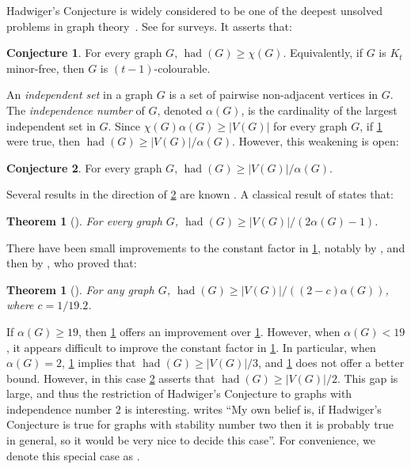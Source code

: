 \documentclass[11pt]{article}
\numberwithin{equation}{section}
\theoremstyle{plain}
\newtheorem{thm}[equation]{Theorem}
\theoremstyle{definition}
\newtheorem{conj}[thm]{Conjecture}
\renewcommand{\geq}{\geqslant}
\DeclareMathOperator{\had}{had}
\newcommand{\defn}[1]{\textcolor{green!50!black}{\textit{#1}}}
\begin{document}
Hadwiger's Conjecture is widely considered to be one of the deepest unsolved problems in graph theory~\citep{Hadwiger43}. See \citep{Kawa15,Toft96,SeymourHC,CV20} for surveys. It asserts that:
\begin{conj}
    \label{conj:hc}
    For every graph $G$, $\had(G) \geq \chi(G)$. Equivalently, if $G$ is $K_t$ minor-free, then $G$ is $(t-1)$-colourable.
\end{conj}
An \defn{independent set} in a graph $G$ is a set of pairwise non-adjacent vertices in $G$. The \defn{independence number} of $G$, denoted \defn{$\alpha(G)$}, is the cardinality of the largest independent set in $G$. Since $\chi(G) \alpha(G) \geq |V(G)|$ for every graph $G$, if \cref{conj:hc} were true, then $\had(G) \geq |V(G)|/\alpha(G)$. However, this weakening is open:
\begin{conj}
    \label{conj:indep}
    For every graph $G$, $\had(G) \geq |V(G)|/\alpha(G)$.
\end{conj}
Several results in the direction of \cref{conj:indep} are known \citep{DM82,Fox10,BK11,bohme2011minors, KawaHadwigerOdd07, FradkinClique12}. A classical result of \citet{DM82} states that:
\begin{thm}[\citet{DM82}]
    \label{thm:dm}
    For every graph $G$, $\had(G) \geq  |V(G)|/ (2\alpha(G) -1)$.
\end{thm}
There have been small improvements to the constant factor in \cref{thm:dm}, notably by \citet{Fox10}, and then by \citet{BK11}, who proved that:
\begin{thm}[\citet{BK11}]
    \label{thm:complete_minors_indep_no}
    For any graph $G$, $\had(G) \geq |V(G)|/((2-c)\alpha(G))$, where $c = 1/19.2$.
\end{thm}
If $\alpha(G) \geq 19$, then \cref{thm:complete_minors_indep_no} offers an improvement over \cref{thm:dm}. However, when $\alpha(G) < 19$, it appears difficult to improve the constant factor in \cref{thm:dm}. In particular, when $\alpha(G) = 2$, \cref{thm:dm} implies that $\had(G) \geq |V(G)|/3$, and \cref{thm:complete_minors_indep_no} does not offer a better bound. However, in this case \cref{conj:indep} asserts that $\had(G) \geq |V(G)|/2$. This gap is large, and thus the restriction of Hadwiger's Conjecture to graphs with independence number $2$ is interesting. \citet{SeymourHC} writes ``My own belief is, if Hadwiger's Conjecture is true for graphs with stability number two then it is probably true in general, so it would be very nice to decide this case''. For convenience, we denote this special case as .
\end{document}
